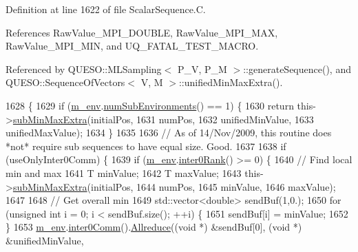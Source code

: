 Definition at line 1622 of file Scalar\-Sequence.\-C.



References Raw\-Value\-\_\-\-M\-P\-I\-\_\-\-D\-O\-U\-B\-L\-E, Raw\-Value\-\_\-\-M\-P\-I\-\_\-\-M\-A\-X, Raw\-Value\-\_\-\-M\-P\-I\-\_\-\-M\-I\-N, and U\-Q\-\_\-\-F\-A\-T\-A\-L\-\_\-\-T\-E\-S\-T\-\_\-\-M\-A\-C\-R\-O.



Referenced by Q\-U\-E\-S\-O\-::\-M\-L\-Sampling$<$ P\-\_\-\-V, P\-\_\-\-M $>$\-::generate\-Sequence(), and Q\-U\-E\-S\-O\-::\-Sequence\-Of\-Vectors$<$ V, M $>$\-::unified\-Min\-Max\-Extra().


\begin{DoxyCode}
1628 \{
1629   \textcolor{keywordflow}{if} (\hyperlink{class_q_u_e_s_o_1_1_scalar_sequence_a71618cd6351b29361b437af68447a4c8}{m\_env}.\hyperlink{class_q_u_e_s_o_1_1_base_environment_ac0345f57e31ef7833e379ed972bd094d}{numSubEnvironments}() == 1) \{
1630     \textcolor{keywordflow}{return} this->\hyperlink{class_q_u_e_s_o_1_1_scalar_sequence_aee81b99614cc5836be198c0cf20879a5}{subMinMaxExtra}(initialPos,
1631                                 numPos,
1632                                 unifiedMinValue,
1633                                 unifiedMaxValue);
1634   \}
1635 
1636   \textcolor{comment}{// As of 14/Nov/2009, this routine does *not* require sub sequences to have equal size. Good.}
1637 
1638   \textcolor{keywordflow}{if} (useOnlyInter0Comm) \{
1639     \textcolor{keywordflow}{if} (\hyperlink{class_q_u_e_s_o_1_1_scalar_sequence_a71618cd6351b29361b437af68447a4c8}{m\_env}.\hyperlink{class_q_u_e_s_o_1_1_base_environment_ae106b5bb8a80b655b88b3a26b1e7c185}{inter0Rank}() >= 0) \{
1640       \textcolor{comment}{// Find local min and max}
1641       T minValue;
1642       T maxValue;
1643       this->\hyperlink{class_q_u_e_s_o_1_1_scalar_sequence_aee81b99614cc5836be198c0cf20879a5}{subMinMaxExtra}(initialPos,
1644                            numPos,
1645                            minValue,
1646                            maxValue);
1647 
1648       \textcolor{comment}{// Get overall min}
1649       std::vector<double> sendBuf(1,0.);
1650       \textcolor{keywordflow}{for} (\textcolor{keywordtype}{unsigned} \textcolor{keywordtype}{int} i = 0; i < sendBuf.size(); ++i) \{
1651         sendBuf[i] = minValue;
1652       \}
1653       \hyperlink{class_q_u_e_s_o_1_1_scalar_sequence_a71618cd6351b29361b437af68447a4c8}{m\_env}.\hyperlink{class_q_u_e_s_o_1_1_base_environment_a689e4d140c74d495d97eb498714a4b82}{inter0Comm}().\hyperlink{class_q_u_e_s_o_1_1_mpi_comm_a72e137e60ef8060efb1ee5fc874fa4b8}{Allreduce}((\textcolor{keywordtype}{void} *) &sendBuf[0], (\textcolor{keywordtype}{void} *) &unifiedMinValue,

\end{DoxyCode}
